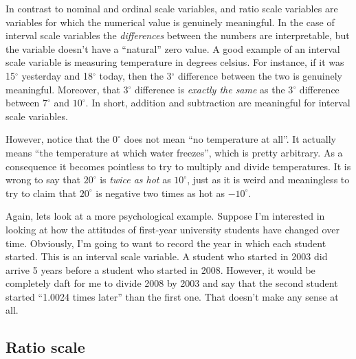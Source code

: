 In contrast to nominal and ordinal scale variables,  and ratio scale variables are variables for which the numerical value is genuinely meaningful. In the case of interval scale variables the {\it differences} between the numbers are interpretable, but the variable doesn't have a ``natural'' zero value. A good example of an interval scale variable is measuring temperature in degrees celsius. For instance, if it was 15$^\circ$ yesterday and 18$^\circ$ today, then the 3$^\circ$ difference between the two is genuinely meaningful. Moreover, that 3$^\circ$ difference is {\it exactly the same} as the 3$^\circ$ difference between $7^\circ$ and $10^\circ$. In short, addition and subtraction are meaningful for interval scale variables. 

However, notice that the $0^\circ$ does not mean ``no temperature at all''. It actually means ``the temperature at which water freezes'', which is pretty arbitrary. As a consequence it becomes pointless to try to multiply and divide temperatures. It is wrong to say that $20^\circ$ is {\it twice as hot} as $10^\circ$, just as it is weird and meaningless to try to claim that $20^\circ$ is negative two times as hot as $-10^\circ$. 

Again, lets look at a more psychological example. Suppose I'm interested in looking at how the attitudes of first-year university students have changed over time. Obviously, I'm going to want to record the year in which each student started. This is an interval scale variable. A student who started in 2003 did arrive 5 years before a student who started in 2008. However, it would be completely daft for me to divide 2008 by 2003 and say that the second student started ``1.0024 times later'' than the first one. That doesn't make any sense at all.

\subsection{Ratio scale}

